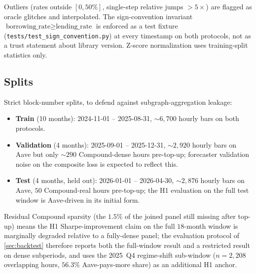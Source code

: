 Outliers (rates outside $[0, 50\%]$, single-step relative jumps
$>5\times$) are flagged as oracle glitches and interpolated. The
sign-convention invariant
$\text{borrowing\_rate}\ge\text{lending\_rate}$ is enforced as a test
fixture (\texttt{tests/test\_sign\_convention.py}) at every timestamp
on both protocols, not as a trust statement about library version.
Z-score normalization uses training-split statistics only.

\subsection{Splits}
\label{sec:splits}

Strict block-number splits, to defend against subgraph-aggregation
leakage:
\begin{itemize}[leftmargin=*, itemsep=2pt]
\item \textbf{Train} (10 months): 2024-11-01 -- 2025-08-31,
  $\sim$$6{,}700$ hourly bars on both protocols.
\item \textbf{Validation} (4 months): 2025-09-01 -- 2025-12-31,
  $\sim$$2{,}920$ hourly bars on Aave but only $\sim$$290$
  Compound-dense hours pre-top-up; forecaster validation noise on the
  composite loss is expected to reflect this.
\item \textbf{Test} (4 months, held out): 2026-01-01 -- 2026-04-30,
  $\sim$$2{,}876$ hourly bars on Aave, $50$ Compound-real hours
  pre-top-up; the H1 evaluation on the full test window is
  Aave-driven in its initial form.
\end{itemize}
Residual Compound sparsity (the $1.5\%$ of the joined panel still
missing after top-up) means the H1 Sharpe-improvement claim on the
full $18$-month window is marginally degraded relative to a fully-dense
panel; the evaluation protocol of \cref{sec:backtest} therefore
reports both the full-window result and a restricted result on dense
subperiods, and uses the 2025~Q4 regime-shift sub-window
($n = 2{,}208$ overlapping hours, $56.3\%$ Aave-pays-more share) as
an additional H1 anchor.
